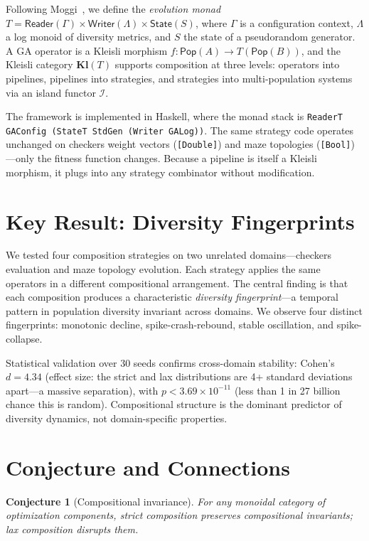 \documentclass[submission,copyright,creativecommons]{eptcs}
\newtheorem{conjecture}{Conjecture}
\begin{document}
Following Moggi~\cite{moggi1991notions}, we define the \emph{evolution
monad} $T = \mathsf{Reader}(\Gamma) \times \mathsf{Writer}(\Lambda)
\times \mathsf{State}(S)$, where $\Gamma$ is a configuration context,
$\Lambda$ a log monoid of diversity metrics, and $S$ the state of a
pseudorandom generator. A GA operator is a Kleisli morphism
$f : \mathsf{Pop}(A) \to T(\mathsf{Pop}(B))$, and the Kleisli category
$\mathbf{Kl}(T)$ supports composition at three levels: operators into
pipelines, pipelines into strategies, and strategies into
multi-population systems via an island functor $\mathcal{I}$.

The framework is implemented in Haskell, where the monad stack is
\texttt{ReaderT GAConfig (StateT StdGen (Writer GALog))}. The same
strategy code operates unchanged on checkers weight vectors
(\texttt{[Double]}) and maze topologies (\texttt{[Bool]})---only the
fitness function changes. Because a pipeline is itself a Kleisli
morphism, it plugs into any strategy combinator without modification.

\section{Key Result: Diversity Fingerprints}

We tested four composition strategies on two unrelated domains---checkers
evaluation and maze topology evolution. Each strategy applies the same
operators in a different compositional arrangement. The central finding
is that each composition produces a characteristic \emph{diversity
fingerprint}---a temporal pattern in population diversity invariant
across domains. We observe four distinct fingerprints: monotonic decline,
spike-crash-rebound, stable oscillation, and spike-collapse.

Statistical validation over 30 seeds confirms cross-domain stability:
Cohen's $d = 4.34$ (effect size: the strict and lax distributions are
4+ standard deviations apart---a massive separation), with
$p < 3.69 \times 10^{-11}$ (less than 1 in 27 billion chance this is
random). Compositional structure is the dominant predictor of diversity
dynamics, not domain-specific properties.

\section{Conjecture and Connections}

\begin{conjecture}[Compositional invariance]
For any monoidal category of optimization components, strict composition
preserves compositional invariants; lax composition disrupts them.
\end{conjecture}
\end{document}

